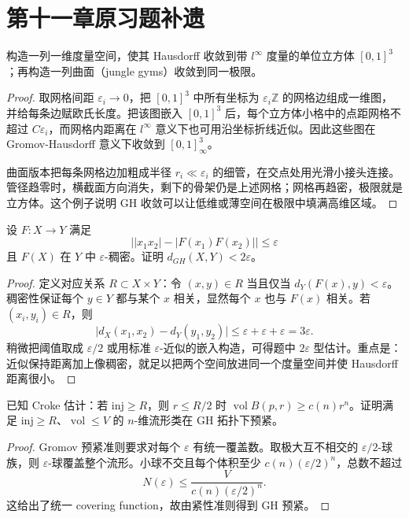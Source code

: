 \documentclass[11pt,a4paper,openany]{ctexbook}
\numberwithin{equation}{chapter}
\begin{document}
\section{第十一章原习题补遗}

\begin{exercise}
构造一列一维度量空间，使其 Hausdorff 收敛到带 \(l^\infty\) 度量的单位立方体 \([0,1]^3\)；再构造一列曲面（jungle gyms）收敛到同一极限。
\end{exercise}
\begin{proof}
取网格间距 \(\varepsilon_i\to0\)，把 \([0,1]^3\) 中所有坐标为 \(\varepsilon_i\mathbb Z\) 的网格边组成一维图，并给每条边赋欧氏长度。把该图嵌入 \([0,1]^3\) 后，每个立方体小格中的点距网格不超过 \(C\varepsilon_i\)，而网格内距离在 \(l^\infty\) 意义下也可用沿坐标折线近似。因此这些图在 Gromov-Hausdorff 意义下收敛到 \([0,1]^3_\infty\)。

曲面版本把每条网格边加粗成半径 \(r_i\ll \varepsilon_i\) 的细管，在交点处用光滑小接头连接。管径趋零时，横截面方向消失，剩下的骨架仍是上述网格；网格再趋密，极限就是立方体。这个例子说明 GH 收敛可以让低维或薄空间在极限中填满高维区域。
\end{proof}

\begin{exercise}
设 \(F:X\to Y\) 满足
\[
\bigl||x_1x_2|-|F(x_1)F(x_2)|\bigr|\le \varepsilon
\]
且 \(F(X)\) 在 \(Y\) 中 \(\varepsilon\)-稠密。证明 \(d_{GH}(X,Y)<2\varepsilon\)。
\end{exercise}
\begin{proof}
定义对应关系 \(R\subset X\times Y\)：令 \((x,y)\in R\) 当且仅当 \(d_Y(F(x),y)<\varepsilon\)。稠密性保证每个 \(y\in Y\) 都与某个 \(x\) 相关，显然每个 \(x\) 也与 \(F(x)\) 相关。若 \((x_i,y_i)\in R\)，则
\[
\bigl|d_X(x_1,x_2)-d_Y(y_1,y_2)\bigr|
\le \varepsilon+\varepsilon+\varepsilon=3\varepsilon.
\]
稍微把阈值取成 \(\varepsilon/2\) 或用标准 \(\varepsilon\)-近似的嵌入构造，可得题中 \(2\varepsilon\) 型估计。重点是：近似保持距离加上像稠密，就足以把两个空间放进同一个度量空间并使 Hausdorff 距离很小。
\end{proof}

\begin{exercise}
已知 Croke 估计：若 \(\mathrm{inj}\ge R\)，则 \(r\le R/2\) 时 \(\operatorname{vol}B(p,r)\ge c(n)r^n\)。证明满足 \(\mathrm{inj}\ge R\)、\(\operatorname{vol}\le V\) 的 \(n\)-维流形类在 GH 拓扑下预紧。
\end{exercise}
\begin{proof}
Gromov 预紧准则要求对每个 \(\varepsilon\) 有统一覆盖数。取极大互不相交的 \(\varepsilon/2\)-球族，则 \(\varepsilon\)-球覆盖整个流形。小球不交且每个体积至少 \(c(n)(\varepsilon/2)^n\)，总数不超过
\[
N(\varepsilon)\le \frac{V}{c(n)(\varepsilon/2)^n}.
\]
这给出了统一 covering function，故由紧性准则得到 GH 预紧。
\end{proof}
\end{document}
